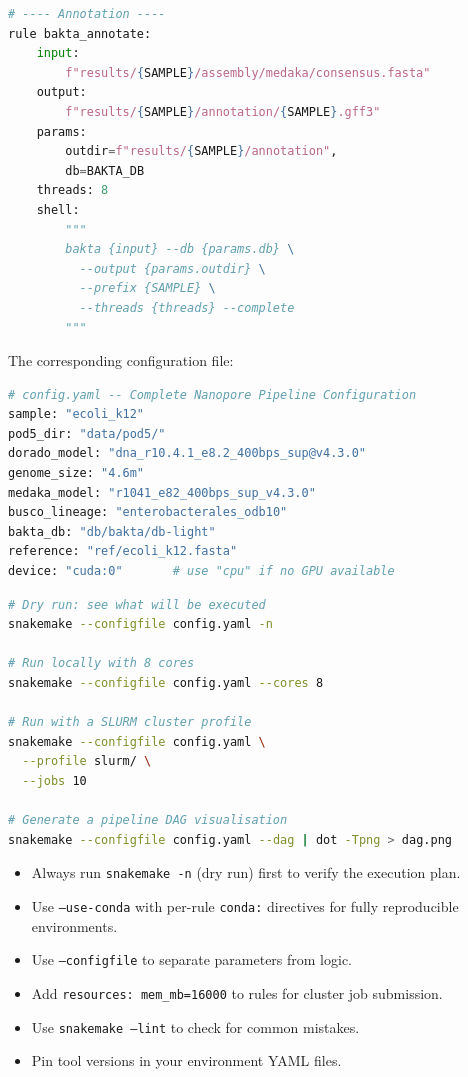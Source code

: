 \begin{lstlisting}[language=Python,caption={Complete end-to-end Snakemake workflow for nanopore analysis (Snakefile).},label=lst:diy-smk-e2e]
# ---- Annotation ----
rule bakta_annotate:
    input:
        f"results/{SAMPLE}/assembly/medaka/consensus.fasta"
    output:
        f"results/{SAMPLE}/annotation/{SAMPLE}.gff3"
    params:
        outdir=f"results/{SAMPLE}/annotation",
        db=BAKTA_DB
    threads: 8
    shell:
        """
        bakta {input} --db {params.db} \
          --output {params.outdir} \
          --prefix {SAMPLE} \
          --threads {threads} --complete
        """
\end{lstlisting}

The corresponding configuration file:

\begin{lstlisting}[language=Python,caption={Configuration file for the end-to-end Snakemake pipeline (config.yaml).},label=lst:diy-smk-e2e-config]
# config.yaml -- Complete Nanopore Pipeline Configuration
sample: "ecoli_k12"
pod5_dir: "data/pod5/"
dorado_model: "dna_r10.4.1_e8.2_400bps_sup@v4.3.0"
genome_size: "4.6m"
medaka_model: "r1041_e82_400bps_sup_v4.3.0"
busco_lineage: "enterobacterales_odb10"
bakta_db: "db/bakta/db-light"
reference: "ref/ecoli_k12.fasta"
device: "cuda:0"       # use "cpu" if no GPU available
\end{lstlisting}

\begin{lstlisting}[language=bash,caption={Running the complete Snakemake pipeline.},label=lst:diy-smk-e2e-run]
# Dry run: see what will be executed
snakemake --configfile config.yaml -n

# Run locally with 8 cores
snakemake --configfile config.yaml --cores 8

# Run with a SLURM cluster profile
snakemake --configfile config.yaml \
  --profile slurm/ \
  --jobs 10

# Generate a pipeline DAG visualisation
snakemake --configfile config.yaml --dag | dot -Tpng > dag.png
\end{lstlisting}

\begin{tipbox}[title={Snakemake Best Practices}]
\begin{itemize}[nosep]
  \item Always run \texttt{snakemake -n} (dry run) first to verify the execution plan.
  \item Use \texttt{--use-conda} with per-rule \texttt{conda:} directives for fully reproducible environments.
  \item Use \texttt{--configfile} to separate parameters from logic.
  \item Add \texttt{resources: mem\_mb=16000} to rules for cluster job submission.
  \item Use \texttt{snakemake --lint} to check for common mistakes.
  \item Pin tool versions in your environment YAML files.
\end{itemize}
\end{tipbox}

